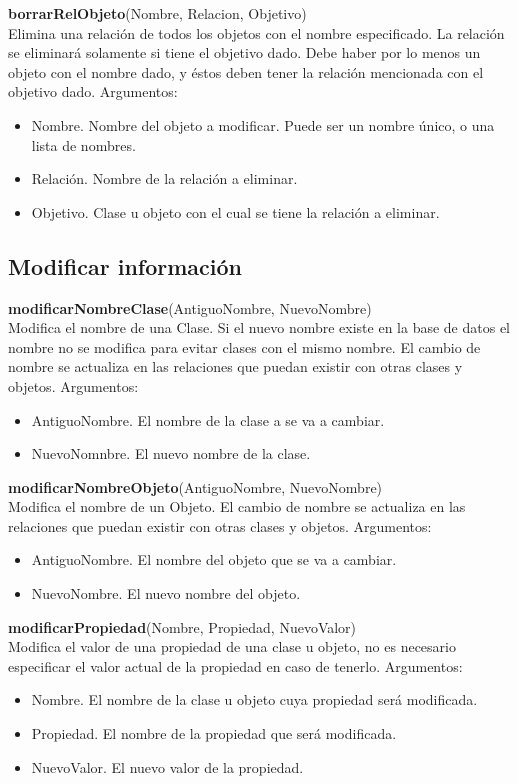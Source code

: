 \documentclass[11pt]{article}
\newcommand{\comando}[2]{
    \textbf{#1}(#2)\\
}
\newenvironment{args}{
    \newline
    Argumentos:
    \begin{itemize}
}{
    \end{itemize}
    \bigskip
}
\begin{document}
\comando{borrarRelObjeto}{Nombre, Relacion, Objetivo}
Elimina una relación de todos los objetos con el nombre especificado. La relación se eliminará solamente si tiene el objetivo dado. Debe haber por lo menos un objeto con el nombre dado, y éstos deben tener la relación mencionada con el objetivo dado.
\begin{args}
    \item Nombre. Nombre del objeto a modificar. Puede ser un nombre único, o una lista de nombres.
    \item Relación. Nombre de la relación a eliminar.
    \item Objetivo. Clase u objeto con el cual se tiene la relación a eliminar.
\end{args}

\subsection{Modificar información}

\comando{modificarNombreClase}{AntiguoNombre, NuevoNombre}
Modifica el nombre de una Clase. Si el nuevo nombre existe en la base de datos el nombre no se modifica para evitar clases con el mismo nombre. El cambio de nombre se actualiza en las relaciones que puedan existir con otras clases y objetos.
\begin{args}
\item AntiguoNombre. El nombre de la clase a se va a cambiar.
\item NuevoNomnbre. El nuevo nombre de la clase.
\end{args}

\comando{modificarNombreObjeto}{AntiguoNombre, NuevoNombre}
Modifica el nombre de un Objeto. El cambio de nombre se actualiza en las relaciones que puedan existir con otras clases y objetos.
\begin{args}
\item AntiguoNombre. El nombre del objeto que se va a cambiar.
\item NuevoNombre. El nuevo nombre del objeto.
\end{args}

\comando{modificarPropiedad}{Nombre, Propiedad, NuevoValor}
Modifica el valor de una propiedad de una clase u objeto, no es necesario especificar el valor actual  de la propiedad en caso de tenerlo.
\begin{args}
\item Nombre. El nombre de la clase u objeto cuya propiedad será modificada.
\item Propiedad. El nombre de la propiedad que será modificada.
\item NuevoValor. El nuevo valor de la propiedad.
\end{args}
\end{document}
